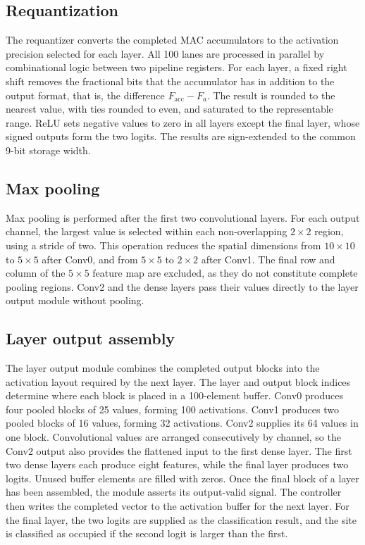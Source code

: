 \subsection{Requantization}
The requantizer converts the completed MAC accumulators to the activation precision selected for each layer. All 100 lanes are processed in parallel by combinational logic between two pipeline registers. For each layer, a fixed right shift removes the fractional bits that the accumulator has in addition to the output format, that is, the difference $F_{\mathrm{acc}} - F_a$. The result is rounded to the nearest value, with ties rounded to even, and saturated to the representable range. ReLU sets negative values to zero in all layers except the final layer, whose signed outputs form the two logits. The results are sign-extended to the common 9-bit storage width.

\subsection{Max pooling}
Max pooling is performed after the first two convolutional layers. For each output channel, the largest value is selected within each non-overlapping $2\times2$ region, using a stride of two. This operation reduces the spatial dimensions from $10\times10$ to $5\times5$ after Conv0, and from $5\times5$ to $2\times2$ after Conv1. The final row and column of the $5\times5$ feature map are excluded, as they do not constitute complete pooling regions. Conv2 and the dense layers pass their values directly to the layer output module without pooling.

\subsection{Layer output assembly}

The layer output module combines the completed output blocks into the activation layout required by the next layer. The layer and output block indices determine where each block is placed in a 100-element buffer.
Conv0 produces four pooled blocks of 25 values, forming 100 activations. Conv1 produces two pooled blocks of 16 values, forming 32 activations. Conv2 supplies its 64 values in one block. Convolutional values are arranged consecutively by channel, so the Conv2 output also provides the flattened input to the first dense layer.
The first two dense layers each produce eight features, while the final layer produces two logits. Unused buffer elements are filled with zeros.
Once the final block of a layer has been assembled, the module asserts its output-valid signal. The controller then writes the completed vector to the activation buffer for the next layer. For the final layer, the two logits are supplied as the classification result, and the site is classified as occupied if the second logit is larger than the first.

